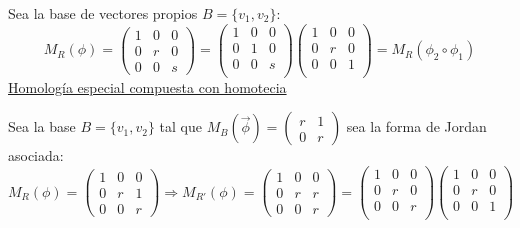 \documentclass[10pt,a4paper,openright]{book}
\begin{document}
\begin{itemize}
Sea la base de vectores propios $B = \{v_1, v_2\}$:
$$M_R (\phi) = \left(\begin{array}{c|cc}
1  & 0 & 0 \\
\hline
0 & r &  0 \\
0 & 0 &  s
\end{array}
\right) = \begin{pmatrix} 1 & 0 & 0 \\ 0 & 1 & 0 \\ 0 & 0 & s \\

\end{pmatrix} \begin{pmatrix} 1 & 0 & 0 \\ 0 & r & 0 \\ 0 & 0 & 1 \\

\end{pmatrix} = M_R (\phi_2 \circ \phi_1)
$$
\underline{Homología especial compuesta con homotecia}

Sea la base $B = \{v_1, v_2\}$ tal que $M_B(\vec{\phi}) = \begin{pmatrix}
r & 1 \\ 0 & r
\end{pmatrix}$ sea la forma de Jordan asociada:
$$M_R (\phi) = \left(\begin{array}{c|cc}
1  & 0 & 0 \\
\hline
0 & r &  1 \\
0 & 0 &  r
\end{array}
\right) \Rightarrow M_{R'} (\phi) = \left(\begin{array}{c|cc}
1  & 0 & 0 \\
\hline
0 & r &  r \\
0 & 0 &  r
\end{array}
\right) = \begin{pmatrix} 1 & 0 & 0 \\ 0 & r & 0 \\ 0 & 0 & r \\

\end{pmatrix} \begin{pmatrix} 1 & 0 & 0 \\ 0 & r & 0 \\ 0 & 0 & 1 \\

\end{pmatrix}$$
\end{itemize}
\end{document}

